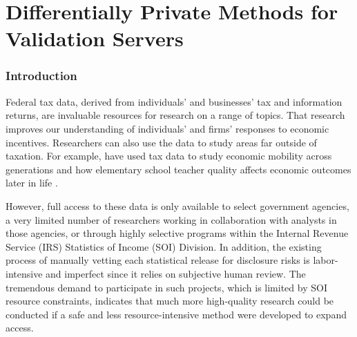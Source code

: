 
\fancyfoot{}



\part{Differentially Private Methods for Validation Servers}

\section{Introduction}\label{sec:intro}

Federal tax data, derived from individuals' and businesses' tax and information returns, are invaluable resources for research on a range of topics. That research improves our understanding of individuals' and firms' responses to economic incentives. Researchers can also use the data to study areas far outside of taxation. For example, \cite{chetty2014measuring} have used tax data to study economic mobility across generations and how elementary school teacher quality affects economic outcomes later in life \autocite{chetty2011does}.

However, full access to these data is only available to select government agencies, a very limited number of researchers working in collaboration with analysts in those agencies, or through highly selective programs within the Internal Revenue Service (IRS) Statistics of Income (SOI) Division. In addition, the existing process of manually vetting each statistical release for disclosure risks is labor-intensive and imperfect since it relies on subjective human review. The tremendous demand to participate in such projects, which is limited by SOI resource constraints, indicates that much more high-quality research could be conducted if a safe and less resource-intensive method were developed to expand access.

